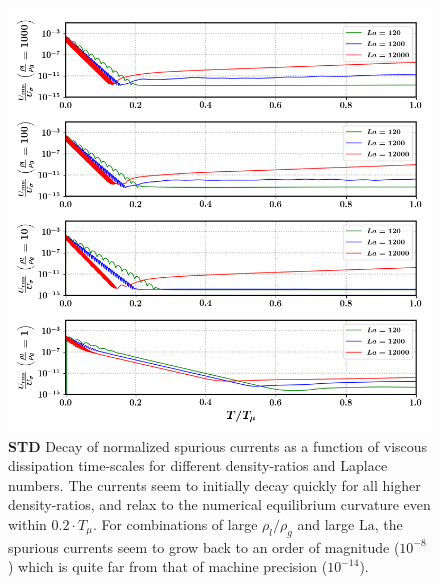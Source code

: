 \begin{figure}[h!]
    \centering
    \includegraphics[]{plots/static_drop/decay_nonmc.png}
	\caption{\textbf{STD} Decay of normalized spurious currents as a function of viscous dissipation time-scales for different density-ratios and Laplace numbers. The currents seem to initially decay quickly for all higher density-ratios, and relax to the numerical equilibrium curvature even within $0.2 \cdot T_\mu$. For combinations of large $\rho_l / \rho_g$ and large $\textrm{La}$, the spurious currents seem to grow back to an order of magnitude ($10^{-8}$) which is quite far from that of machine precision ($10^{-14}$).}   
    \label{decay_nonmc}
\end{figure}


